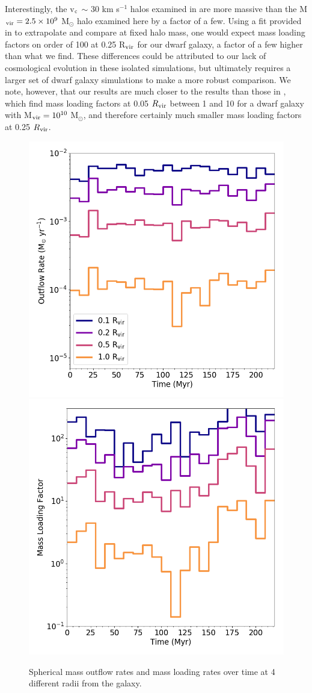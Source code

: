 \documentclass[twocolumn]{aastex61}
\begin{document}
Interestingly, the v$_{\rm c}$ $\sim$ 30 km s$^{-1}$ halos examined in \citet{Muratov2015} are more massive than the M$_{\rm vir} = 2.5\times 10^9$ M$_{\odot}$ halo examined here by a factor of a few. Using a fit provided in \citet{Muratov2015} to extrapolate and compare at fixed halo mass, one would expect mass loading factors on order of 100 at 0.25 R$_{\rm vir}$ for our dwarf galaxy, a factor of a few higher than what we find. These differences could be attributed to our lack of cosmological evolution in these isolated simulations, but ultimately requires a larger set of dwarf galaxy simulations to make a more robust comparison. We note, however, that our results are much closer to the \citep{Muratov2015} results than those in \citet{Hu2016,Hu2017}, which find mass loading factors at 0.05 $R_{\rm vir}$ between 1 and 10 for a dwarf galaxy with M$_{\rm vir} = 10^{10}$ M$_{\odot}$, and therefore certainly much smaller mass loading factors at 0.25 $R_{\rm vir}$.

\begin{figure}
\centering
\includegraphics[width=0.45\linewidth]{total_mass_outflow}
\includegraphics[width=0.45\linewidth]{total_mass_loading}
\caption{Spherical mass outflow rates and mass loading rates over time at 4 different radii from the galaxy.}
\label{fig:mass_outflow}
\end{figure}
\end{document}
